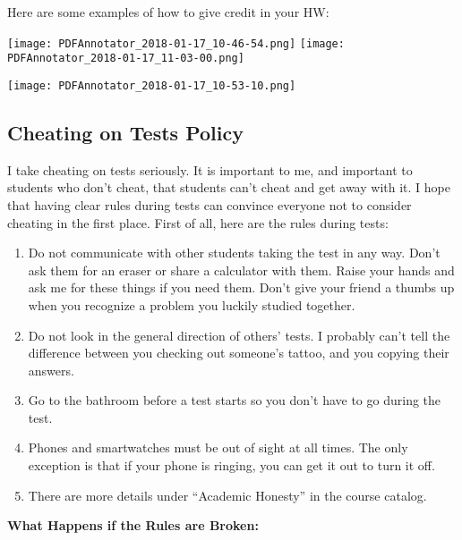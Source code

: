 \documentclass[12pt, twoside]{article}
\begin{document}
Here are some examples of how to give credit in your HW:

\noindent\texttt{[image: PDFAnnotator\_2018-01-17\_10-46-54.png]}
\texttt{[image: PDFAnnotator\_2018-01-17\_11-03-00.png]}

\texttt{[image: PDFAnnotator\_2018-01-17\_10-53-10.png]}

\newpage 
\subsection*{Cheating on Tests Policy}
I take cheating on tests seriously. It is important to me, and important to students who don't cheat, that students can't cheat and get away with it. I hope that having clear rules during tests can convince everyone not to consider cheating in the first place. First of all, here are the rules during tests:

\begin{enumerate}
   \item Do not communicate with other students taking the test in any way. Don't ask them for an eraser or share a calculator with them. Raise your hands and ask me for these things if you need them. Don't give your friend a thumbs up when you recognize a problem you luckily studied together. 
   \item Do not look in the general direction of others' tests. I probably can't tell the difference between you checking out someone's tattoo, and you copying their answers.
   \item Go to the bathroom before a test starts so you don't have to go during the test.
   \item Phones and smartwatches must be out of sight at all times. The only exception is that if your phone is ringing, you can get it out to turn it off.
   \item There are more details under ``Academic Honesty'' in the course catalog.
\end{enumerate}

{\centering\textbf{What Happens if the Rules are Broken:} \par}
\end{document}
